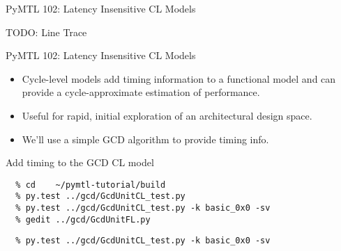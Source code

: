 \begin{frame}{PyMTL 102: Latency Insensitive CL Models}

TODO: Line Trace

\end{frame}

\begin{frame}{PyMTL 102: Latency Insensitive CL Models}

\begin{itemize}
  \item Cycle-level models add timing information to a functional model
        and can provide a cycle-approximate estimation of performance.
  \smallskip
  \item Useful for rapid, initial exploration of an
        architectural design space.
  \smallskip
  \item We'll use a simple GCD algorithm to provide timing info.
\end{itemize}

\end{frame}

\begin{task}\begin{frame}[fragile]{Add timing to the GCD CL model}
\vspace{-0.25in}
\begin{verbatim}
  % cd    ~/pymtl-tutorial/build
  % py.test ../gcd/GcdUnitCL_test.py
  % py.test ../gcd/GcdUnitCL_test.py -k basic_0x0 -sv
  % gedit ../gcd/GcdUnitFL.py
\end{verbatim}


\vspace{-0.3in}
\begin{verbatim}
  % py.test ../gcd/GcdUnitCL_test.py -k basic_0x0 -sv
\end{verbatim}
\end{frame}
\end{task}

